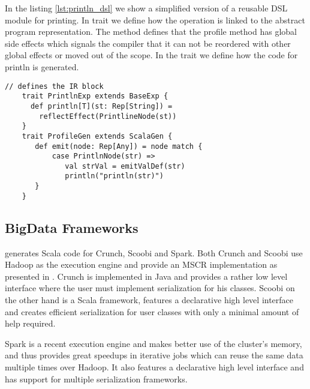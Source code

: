In the listing \ref{lst:println_dsl} we show a simplified version of a reusable DSL module for printing. In trait  we define how the  operation is linked to the abstract program representation. The  method defines that the profile method has global side effects which signals the compiler that it can not be reordered with other global effects or moved out of the scope. In the  trait we define how the code for println is generated. 

\begin{lstlisting}[name=code, caption=Example of how the DSL module is specified. Example module is used for profiling a block of code and it can be reused in any other Scala backed DSL. \scode{Rep} types., captionpos=b, label=lst:println_dsl, float=t]
    // defines the IR block
    trait PrintlnExp extends BaseExp {
      def println[T](st: Rep[String]) =
        reflectEffect(PrintlineNode(st)) 
    }
    trait ProfileGen extends ScalaGen {
       def emit(node: Rep[Any]) = node match {
           case PrintlnNode(str) =>
              val strVal = emitValDef(str)  
              println("println(str)")
       }
    }
\end{lstlisting}

\subsection{BigData Frameworks}
\tool generates Scala code for Crunch, Scoobi and Spark. Both Crunch and Scoobi use Hadoop as the execution engine and provide an MSCR implementation as presented in \cite{chambers_flumejava:_2010}. Crunch is implemented in Java and provides a rather low level interface where the user must implement serialization for his classes. Scoobi on the other hand is a Scala framework, features a declarative high level interface and creates efficient serialization for user classes with only a minimal amount of help required. 

Spark is a recent execution engine and makes better use of the cluster's memory, and thus provides great speedups in iterative jobs which can reuse the same data multiple times over Hadoop. It also features a declarative high level interface and has support for multiple serialization frameworks. 

